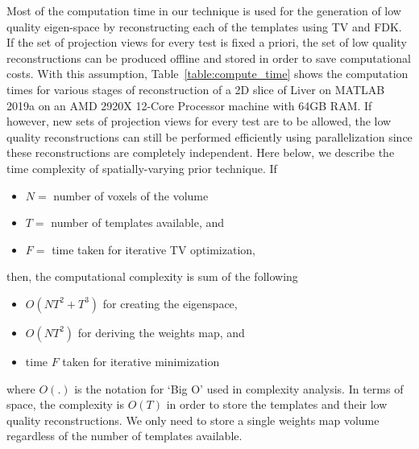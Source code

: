 \documentclass{article}
\begin{document}
\begin{itemize}
  
Most of the computation time in our technique is used for the
generation of low quality eigen-space by reconstructing each of the
templates using TV and FDK. If the set of projection views for every
test is fixed a priori, the set of low quality reconstructions can be
produced offline and stored in order to save computational costs. With
this assumption, Table~\ref{table:compute_time} shows the computation
times for various stages of reconstruction of a 2D slice of Liver on
MATLAB 2019a on an AMD 2920X 12-Core Processor machine with 64GB
RAM. If however, new sets of projection views for every test are to be
allowed, the low quality reconstructions can still be performed
efficiently using parallelization since these reconstructions are
completely independent. Here below, we describe the time complexity of
spatially-varying prior technique.  If
\begin{itemize}
\item $N =$ number of voxels of the volume
\item $T =$ number of templates available, and
\item $F =$ time taken for iterative TV optimization,
\end{itemize}
then, the computational complexity is sum of the following
\begin{itemize}
\item $O(NT^2+T^3)$ for creating the eigenspace,
\item $O(NT^2)$ for deriving the weights map, and
\item time $F$  taken for iterative minimization
\end{itemize}
where $O(.)$ is the notation for `Big O' used in complexity analysis. 
In terms of space, the complexity is $O(T)$ in order to store the templates and their low quality reconstructions. We only need to store a single weights map volume regardless of the number of templates available.


\end{itemize}
\end{document}
